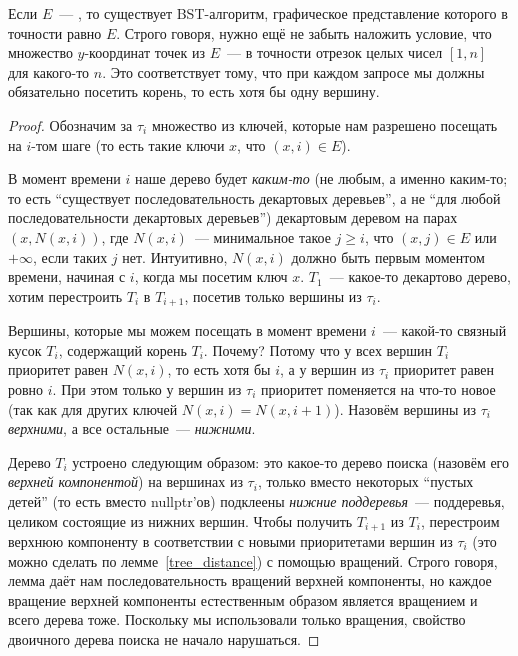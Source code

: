 \begin{theorem}\label{arbs_to_bst} Если $E$~--- \arbs, то существует BST-алгоритм, графическое представление
которого в точности равно $E$. Строго говоря, нужно ещё не забыть наложить
условие, что множество $y$-координат точек из $E$~--- в точности отрезок целых чисел $[1, n]$ для какого-то $n$. Это соответствует тому, что при каждом запросе мы должны обязательно посетить корень, то есть хотя бы одну вершину.
\end{theorem}
\begin{proof} Обозначим за $\tau_i$ множество из ключей, которые нам разрешено посещать на $i$-том шаге (то есть такие ключи $x$, что $(x, i) \in E$).

В момент времени $i$ наше дерево будет \emph{каким-то} (не любым, а именно каким-то; то есть ``существует последовательность декартовых деревьев'', а не ``для любой последовательности декартовых деревьев'') декартовым деревом на парах $(x, N(x, i))$, где $N(x, i)$~--- минимальное такое $j \geqslant i$, что $(x, j) \in E$ или $+\infty$, если таких $j$ нет. Интуитивно, $N(x, i)$ должно быть первым моментом времени, начиная с $i$, когда мы посетим ключ $x$. $T_1$~--- какое-то декартово дерево, хотим перестроить $T_i$ в $T_{i+1}$, посетив только вершины из $\tau_i$.

Вершины, которые мы можем посещать в момент времени $i$~--- какой-то связный кусок $T_i$, содержащий корень $T_i$. Почему? Потому что у всех вершин $T_i$ приоритет равен $N(x, i)$, то есть хотя бы $i$, а у вершин из $\tau_i$ приоритет равен ровно $i$. При этом только
у вершин из $\tau_i$ приоритет поменяется на что-то новое (так как для других ключей $N(x, i) = N(x, i + 1)$).  Назовём вершины из $\tau_i$ \emph{верхними}, а все остальные~--- \emph{нижними}.

Дерево $T_i$ устроено следующим образом: это какое-то дерево поиска (назовём его \emph{верхней компонентой}) на вершинах из $\tau_i$, только вместо некоторых ``пустых детей'' (то есть вместо \textrm{nullptr}'ов) подклеены \emph{нижние поддеревья}~--- поддеревья, целиком состоящие из нижних вершин. Чтобы получить $T_{i+1}$ из $T_i$, перестроим верхнюю компоненту в соответствии с новыми приоритетами вершин из $\tau_i$ (это можно сделать по лемме~\ref{tree_distance}) с помощью вращений. Строго говоря, лемма даёт нам последовательность вращений верхней компоненты, но каждое вращение верхней компоненты естественным образом является вращением и всего дерева тоже. Поскольку мы использовали только вращения, свойство двоичного дерева поиска не начало нарушаться.


\end{proof}
